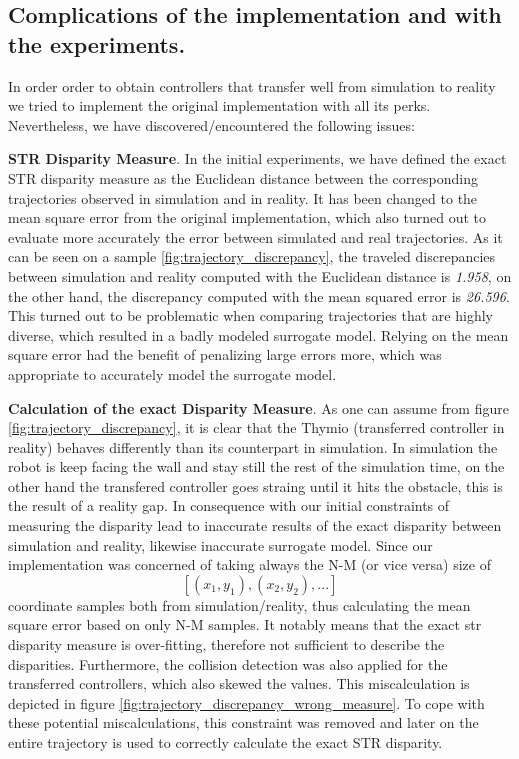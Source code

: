 \subsection{Complications of the implementation and with the experiments.} 

In order order to obtain controllers that transfer well from simulation to reality we tried to implement the original implementation with all its perks. Nevertheless, we have discovered/encountered the following issues:

\begin{description}
	
    \item{\textbf{STR Disparity Measure}}. In the initial experiments, we have defined the exact STR disparity measure as the Euclidean distance between the corresponding trajectories observed in simulation and in reality. It has been changed to the mean square error from the original implementation, which also turned out to evaluate more accurately the error between simulated and real trajectories. As it can be seen on a sample \ref{fig:trajectory_discrepancy}, the traveled discrepancies between simulation and reality computed with the Euclidean distance is \textit{1.958}, on the other hand, the discrepancy computed with the mean squared error is \textit{26.596}. This turned out to be problematic when comparing trajectories that are highly diverse, which resulted in a badly modeled surrogate model. Relying on the mean square error had the benefit of penalizing large errors more, which was appropriate to accurately model the surrogate model. 
    
    \item{\textbf{Calculation of the exact Disparity Measure}}. As one can assume from figure \ref{fig:trajectory_discrepancy}, it is clear that the Thymio (transferred controller in reality) behaves differently than its counterpart in simulation. In simulation the robot is keep facing the wall and stay still the rest of the simulation time, on the other hand the transfered controller goes straing until it hits the obstacle, this is the result of a reality gap. In consequence with our initial constraints of measuring the disparity lead to inaccurate results of the exact disparity between simulation and reality, likewise inaccurate surrogate model. Since our implementation was concerned of taking always the N-M (or vice versa) size of \[ [(x_1,y_1), (x_2, y_2), ...] \] coordinate samples both from simulation/reality, thus calculating the mean square error based on only N-M samples. It notably means that the exact str disparity measure is over-fitting, therefore not sufficient to describe the disparities. Furthermore, the collision detection was also applied for the transferred controllers, which also skewed the values. This miscalculation is depicted in figure \ref{fig:trajectory_discrepancy_wrong_measure}. To cope with these potential miscalculations, this constraint was removed and later on the entire trajectory is used to correctly calculate the exact STR disparity.
	
\end{description}

